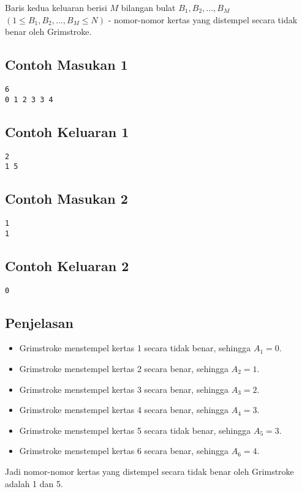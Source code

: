 \documentclass{article}
\begin{document}
Baris kedua keluaran berisi $M$ bilangan bulat $B_1, B_2, ..., B_M$ $(1 \leq B_1, B_2, ..., B_M \leq N)$ - nomor-nomor kertas yang distempel secara tidak benar oleh Grimstroke.

\begin{multicols}{2}
\subsection*{Contoh Masukan 1}
\begin{lstlisting}
6
0 1 2 3 3 4
\end{lstlisting}
\null
\columnbreak
\subsection*{Contoh Keluaran 1}
\begin{lstlisting}
2
1 5
\end{lstlisting}
\vfill
\null
\end{multicols}

\begin{multicols}{2}
\subsection*{Contoh Masukan 2}
\begin{lstlisting}
1
1
\end{lstlisting}
\null
\columnbreak
\subsection*{Contoh Keluaran 2}
\begin{lstlisting}
0
\end{lstlisting}
\vfill
\null
\end{multicols}

\subsection*{Penjelasan}
\begin{itemize}
    \item Grimstroke menstempel kertas 1 secara tidak benar, sehingga $A_1 = 0$.
    \item Grimstroke menstempel kertas 2 secara benar, sehingga $A_2 = 1$.
    \item Grimstroke menstempel kertas 3 secara benar, sehingga $A_3 = 2$.
    \item Grimstroke menstempel kertas 4 secara benar, sehingga $A_4 = 3$.
    \item Grimstroke menstempel kertas 5 secara tidak benar, sehingga $A_5 = 3$.
    \item Grimstroke menstempel kertas 6 secara benar, sehingga $A_6 = 4$.
\end{itemize}
Jadi nomor-nomor kertas yang distempel secara tidak benar oleh Grimstroke adalah 1 dan 5.
\end{document}
